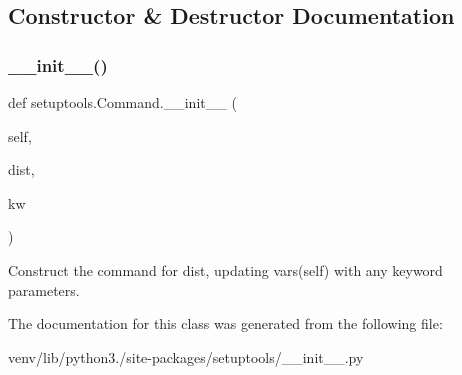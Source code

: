 \subsection{Constructor \& Destructor Documentation}
\mbox{\label{classsetuptools_1_1_command_a14ec5a9290a2b78f0ffe85b0144374b0}} 
\subsubsection{\texorpdfstring{\+\_\+\+\_\+init\+\_\+\+\_\+()}{\_\_init\_\_()}}
{\footnotesize\ttfamily def setuptools.\+Command.\+\_\+\+\_\+init\+\_\+\+\_\+ (\begin{DoxyParamCaption}\item[{}]{self,  }\item[{}]{dist,  }\item[{}]{kw }\end{DoxyParamCaption})}

\begin{DoxyVerb}Construct the command for dist, updating
vars(self) with any keyword parameters.
\end{DoxyVerb}
 

The documentation for this class was generated from the following file\+:\begin{DoxyCompactItemize}
\item 
venv/lib/python3./site-\/packages/setuptools/\+\_\+\+\_\+init\+\_\+\+\_\+.\+py\end{DoxyCompactItemize}
